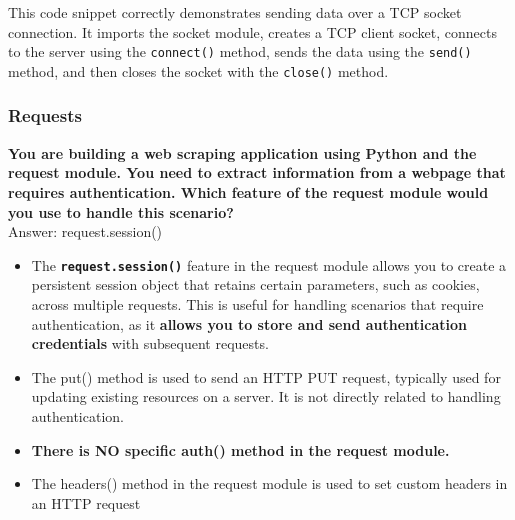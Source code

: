 This code snippet correctly demonstrates sending data over a TCP socket connection. It imports the socket module, creates a TCP client socket, connects to the server using the \texttt{connect()} method, sends the data using the \texttt{send()} method, and then closes the socket with the \texttt{close()} method.

\newpage
\subsubsection{Requests}
\textbf{You are building a web scraping application using Python and the request module. You need to extract information from a webpage that requires authentication. Which feature of the request module would you use to handle this scenario?} \\

Answer: request.session()

\begin{itemize}
\item The \textbf{\texttt{request.session()}} feature in the request module allows you to create a persistent session object that retains certain parameters, such as cookies, across multiple requests. This is useful for handling scenarios that require authentication, as it \textbf{allows you to store and send authentication credentials} with subsequent requests.

\item The put() method is used to send an HTTP PUT request, typically used for updating existing resources on a server. It is not directly related to handling authentication.

\item \textbf{There is NO specific auth() method in the request module.}

\item The headers() method in the request module is used to set custom headers in an HTTP request
\end{itemize}

